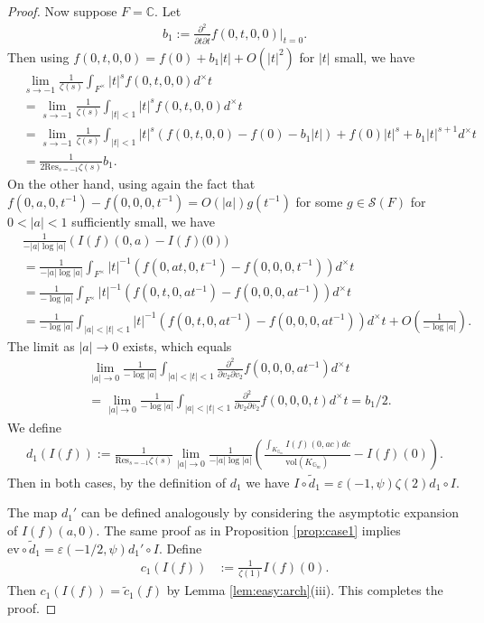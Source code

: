 \documentclass[11pt,a4paper,reqno]{amsart}
\theoremstyle{remark}
\numberwithin{equation}{section}
\newcommand{\CC}{\mathbb{C}}
\newcommand{\GG}{\mathbb{G}}
\theoremstyle{definition}
\renewcommand{\bar}{\overline}
\numberwithin{equation}{section}
\begin{document}
\begin{proof}
Now suppose $F=\CC.$ Let 
\begin{align*}
    b_{1}:=\frac{\partial^2}{\partial t\partial \bar{t}}f(0,t,0,0)\bigg|_{t=0}.
\end{align*}
Then using $f(0,t,0,0)=f(0)+b_1|t|+O(|t|^2)$ for $|t|$ small, we have
\begin{align*}
    &\lim_{s\to -1}\frac{1}{\zeta(s)}\int_{F^\times} |t|^{s}f(0,t,0,0) d^\times t\\
    &=\lim_{s\to -1} \frac{1}{\zeta(s)}\int_{|t|<1} |t|^{s}f(0,t,0,0) d^\times t\\
    &=\lim_{s\to -1} \frac{1}{\zeta(s)}\int_{|t|<1} |t|^{s}\left(f(0,t,0,0)-f(0)-b_1|t|\right)+f(0)|t|^s+b_1|t|^{s+1} d^\times t\\
    &=\frac{1}{2\mathrm{Res}_{s=-1}\zeta(s)} b_1.
\end{align*}
On the other hand, using again the fact that $f(0,a,0,t^{-1})-f(0,0,0,t^{-1})=O(|a|)g(t^{-1})$ for some $g\in \mathcal{S}(F)$ for $0<|a|<1$ sufficiently small, we have
\begin{align*}
    &\frac{1}{-|a|\log |a|}\left(I(f)(0,a)-I(f)(0\right)) \\&=\frac{1}{-|a|\log |a|}\int_{F^\times}|t|^{-1}\left(f(0,at,0,t^{-1})-f(0,0,0,t^{-1})\right) d^\times t\\
    &=\frac{1}{-\log |a|}\int_{F^\times}|t|^{-1}\left(f(0,t,0,at^{-1})-f(0,0,0,at^{-1})\right) d^\times t\\
    &=\frac{1}{-\log |a|}\int_{|a|<|t|<1}|t|^{-1}\left(f(0,t,0,at^{-1})-f(0,0,0,at^{-1})\right) d^\times t+O\left(\frac{1}{-\log |a|}\right).
\end{align*}
The limit as $|a|\to 0$ exists, which equals
\begin{align*}
    &\lim_{|a|\to 0}\frac{1}{-\log |a|}\int_{|a|<|t|<1}\frac{\partial^2}{\partial v_2\partial \bar{v}_2}f(0,0,0,at^{-1})d^\times t\\
    &=\lim_{|a|\to 0}\frac{1}{-\log |a|}\int_{|a|<|t|<1}\frac{\partial^2}{\partial v_2\partial \bar{v}_2}f(0,0,0,t)d^\times t=b_1/2.
\end{align*}
We define
\begin{align*}
    d_1(I(f)):=\frac{1}{\mathrm{Res}_{s=-1} \zeta(s)}\lim_{|a|\to 0}\frac{1}{-|a|\log |a|} \left(\frac{\int_{K_{\GG_m}}I(f)(0,ac)dc}{\mathrm{vol}(K_{\GG_m})}-I(f)(0)\right).
\end{align*}
Then in both cases, by the definition of $d_1$ we have $I\circ \tilde{d}_1=\varepsilon(-1,\psi)\zeta(2)d_1\circ I.$

The map $d_1'$ can be defined analogously by considering the asymptotic expansion of $I(f)(a,0)$. The same proof as in Proposition \ref{prop:case1} implies $\mathrm{ev}\circ\tilde{d}_1=\varepsilon(-1/2,\psi)d_1'\circ I.$ Define
\begin{align*}
    c_1(I(f))&:=\frac{1}{\zeta(1)}I(f)(0).
\end{align*}
Then $c_1(I(f))=\tilde{c}_1(f)$ by Lemma \ref{lem:easy:arch}(iii). This completes the proof.

\end{proof}
\end{document}
